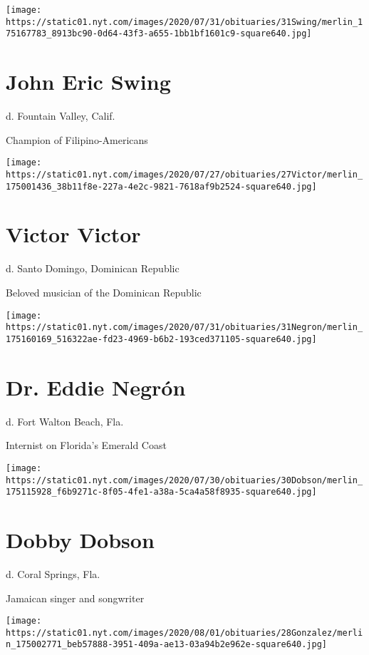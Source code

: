 \texttt{[image: https://static01.nyt.com/images/2020/07/31/obituaries/31Swing/merlin\_175167783\_8913bc90-0d64-43f3-a655-1bb1bf1601c9-square640.jpg]}

\hypertarget{john-eric-swing}{%
\section{John Eric Swing}\label{john-eric-swing}}

d. Fountain Valley, Calif.

Champion of Filipino-Americans

\texttt{[image: https://static01.nyt.com/images/2020/07/27/obituaries/27Victor/merlin\_175001436\_38b11f8e-227a-4e2c-9821-7618af9b2524-square640.jpg]}

\hypertarget{victor-victor}{%
\section{Victor Victor}\label{victor-victor}}

d. Santo Domingo, Dominican Republic

Beloved musician of the Dominican Republic

\texttt{[image: https://static01.nyt.com/images/2020/07/31/obituaries/31Negron/merlin\_175160169\_516322ae-fd23-4969-b6b2-193ced371105-square640.jpg]}

\hypertarget{dr-eddie-negruxf3n}{%
\section{Dr. Eddie Negrón}\label{dr-eddie-negruxf3n}}

d. Fort Walton Beach, Fla.

Internist on Florida's Emerald Coast

\texttt{[image: https://static01.nyt.com/images/2020/07/30/obituaries/30Dobson/merlin\_175115928\_f6b9271c-8f05-4fe1-a38a-5ca4a58f8935-square640.jpg]}

\hypertarget{dobby-dobson}{%
\section{Dobby Dobson}\label{dobby-dobson}}

d. Coral Springs, Fla.

Jamaican singer and songwriter

\texttt{[image: https://static01.nyt.com/images/2020/08/01/obituaries/28Gonzalez/merlin\_175002771\_beb57888-3951-409a-ae13-03a94b2e962e-square640.jpg]}

